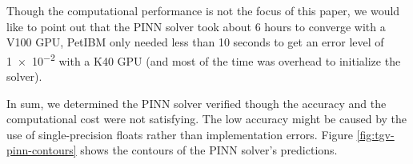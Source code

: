 Though the computational performance is not the focus of this paper, we would like to point out that the PINN solver took about 6 hours to converge with a V100 GPU, PetIBM only needed less than 10 seconds to get an error level of \num{1e-2} with a K40 GPU (and most of the time was overhead to initialize the solver).

In sum, we determined the PINN solver verified though the accuracy and the computational cost were not satisfying.
The low accuracy might be caused by the use of single-precision floats rather than implementation errors.
Figure \ref{fig:tgv-pinn-contours} shows the contours of the PINN solver's predictions.

